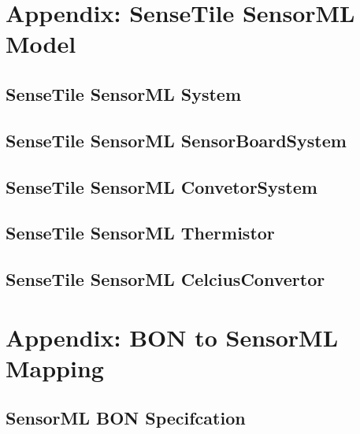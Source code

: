 \documentclass[]{final_report}
\begin{document}
\appendix
\chapter{Appendix: SenseTile SensorML Model}
\section{SenseTile SensorML System}
\section{SenseTile SensorML SensorBoardSystem}
\section{SenseTile SensorML ConvetorSystem}
\section{SenseTile SensorML Thermistor}

\section{SenseTile SensorML CelciusConvertor}


\chapter{Appendix: BON to SensorML Mapping}\label{appenB}
\section {SensorML BON Specifcation}\label{appenBSMLBONSpec}

\lstset{basicstyle=\scriptsize,showspaces=false,showstringspaces=false}

\end{document}
